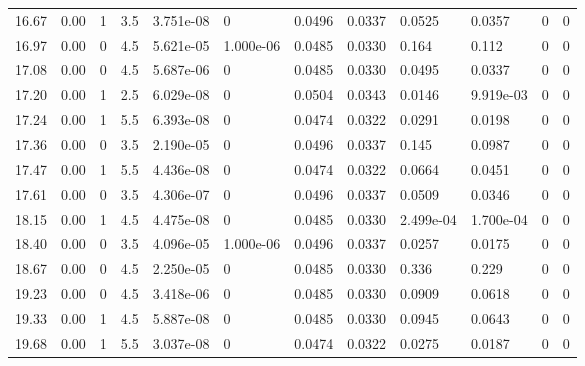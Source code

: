\documentclass[preview]{standalone}
\begin{document}
{{\begin{tabular}{L{1.2cm}C{1.2cm} C{0.3cm}C{0.5cm} C{1.4cm}C{1.4cm} C{1.4cm}C{1.4cm} C{1.6cm}C{1.6cm} C{1.6cm}C{1.6cm}}
  16.67  &  0.00  & 1     & 3.5 &  3.751e-08  & 0  &  0.0496&   0.0337& 0.0525 & 0.0357   &  0 & 0  \\ 
  16.97  &  0.00  & 0     & 4.5 &  5.621e-05  & 1.000e-06  &  0.0485&   0.0330& 0.164 & 0.112   &  0 & 0  \\ 
  17.08  &  0.00  & 0     & 4.5 &  5.687e-06  & 0  &  0.0485&   0.0330& 0.0495 & 0.0337   &  0 & 0  \\ 
  17.20  &  0.00  & 1     & 2.5 &  6.029e-08  & 0  &  0.0504&   0.0343& 0.0146 & 9.919e-03   &  0 & 0  \\ 
  17.24  &  0.00  & 1     & 5.5 &  6.393e-08  & 0  &  0.0474&   0.0322& 0.0291 & 0.0198   &  0 & 0  \\ 
  17.36  &  0.00  & 0     & 3.5 &  2.190e-05  & 0  &  0.0496&   0.0337& 0.145 & 0.0987   &  0 & 0  \\ 
  17.47  &  0.00  & 1     & 5.5 &  4.436e-08  & 0  &  0.0474&   0.0322& 0.0664 & 0.0451   &  0 & 0  \\ 
  17.61  &  0.00  & 0     & 3.5 &  4.306e-07  & 0  &  0.0496&   0.0337& 0.0509 & 0.0346   &  0 & 0  \\ 
  18.15  &  0.00  & 1     & 4.5 &  4.475e-08  & 0  &  0.0485&   0.0330& 2.499e-04 & 1.700e-04   &  0 & 0  \\ 
  18.40  &  0.00  & 0     & 3.5 &  4.096e-05  & 1.000e-06  &  0.0496&   0.0337& 0.0257 & 0.0175   &  0 & 0  \\ 
  18.67  &  0.00  & 0     & 4.5 &  2.250e-05  & 0  &  0.0485&   0.0330& 0.336 & 0.229   &  0 & 0  \\ 
  19.23  &  0.00  & 0     & 4.5 &  3.418e-06  & 0  &  0.0485&   0.0330& 0.0909 & 0.0618   &  0 & 0  \\ 
  19.33  &  0.00  & 1     & 4.5 &  5.887e-08  & 0  &  0.0485&   0.0330& 0.0945 & 0.0643   &  0 & 0  \\ 
  19.68  &  0.00  & 1     & 5.5 &  3.037e-08  & 0  &  0.0474&   0.0322& 0.0275 & 0.0187   &  0 & 0  \\ 
\hline 
\end{tabular} 

}}
\end{document}
